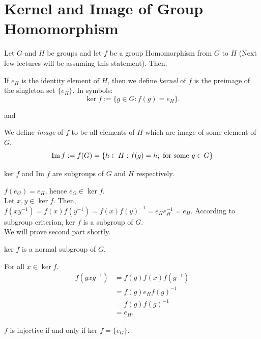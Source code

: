 \section{Kernel and Image of Group Homomorphism}
Let $G$ and $H$ be groups and let $f$ be a group Homomorphism from $G$ to $H$ (Next few lectures will be assuming this statement). Then,
\begin{definition}[Kernel]
    If $e_H$ is the identity element of $H$, then we define \textit{kernel} of $f$ is the preimage of the singleton set $\{e_H\}$. In symbols:
    \[\ker f := \{g \in G: f(g) =e_H\}.\]
\end{definition}
and
\begin{definition}[Image]
    We define \textit{image} of $f$ to be all elements of $H$ which are image of some element of $G$.
    \[\operatorname{Im} f := f(G) = \{h \in H: f(g) = h; \text{ for some } g \in G\}\]
\end{definition}
\begin{lemma}
    ker $f$ and Im $f$ are subgroups of $G$ and $H$ respectively.
\end{lemma}
\begin{lemmaproof}
    $f(e_G) = e_H$, hence $e_G \in \ker f$.\\
    Let $x, y \in \ker f$. Then, $f(xy^{-1}) = f(x) f(y^{-1}) = f(x)f(y)^{-1} = e_He_H^{-1} = e_H$.
    According to subgroup criterion, ker $f$ is a subgroup of $G$.\\
    We will prove second part shortly.
\end{lemmaproof}
\begin{lemma}
    ker $f$ is a normal subgroup of $G$.
\end{lemma}
\begin{lemmaproof}
    For all $x \in \ker f$.
    \begin{align*}
        f(g x g^{-1}) &= f(g) f(x) f(g^{-1})\\
                    &= f(g) e_H f(g)^{-1}\\
                    &= f(g) f(g)^{-1}\\
                    &= e_H.
\end{align*}
\end{lemmaproof}
\begin{lemma}
    \label{def:injectivehomo}
    $f$ is injective if and only if ker $f = \{e_G\}$.
\end{lemma}
